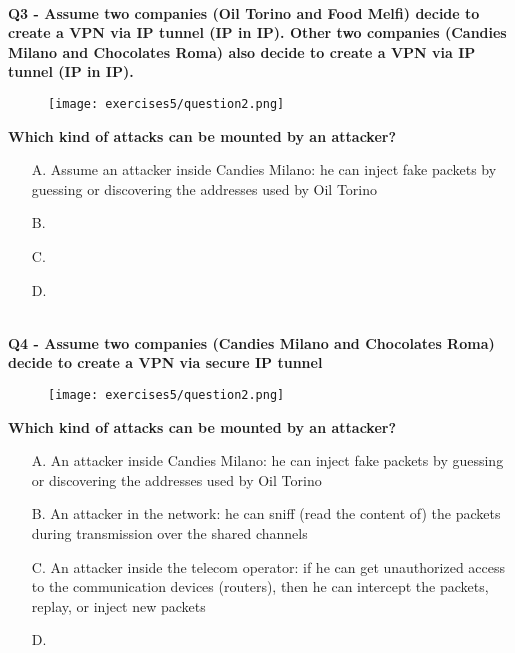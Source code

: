 \textbf{\\Q3 - Assume two companies (Oil Torino and Food Melfi) decide to create a VPN via IP tunnel (IP in IP).
Other two companies (Candies Milano and Chocolates Roma) also decide to create a VPN via IP tunnel (IP in IP).}
\begin{figure}[h]
    \centering
    \texttt{[image: exercises5/question2.png]}
\end{figure}
\textbf{Which kind of attacks can be mounted by an attacker?}
\begin{itemize}
    \item[A.] Assume an attacker inside Candies Milano: he can inject fake packets by guessing or discovering the addresses used by Oil Torino
    \item[B.] 
    \item[C.] 
    \item[D.] 
\end{itemize}


\textbf{\\Q4 - Assume two companies (Candies Milano and Chocolates Roma) decide to create a VPN via secure IP tunnel}
\begin{figure}[h]
    \centering
    \texttt{[image: exercises5/question2.png]}
\end{figure}
\textbf{Which kind of attacks can be mounted by an attacker?}
\begin{itemize}
    \item[A.] An attacker inside Candies Milano: he can inject fake packets by guessing or discovering the addresses used by Oil Torino
    \item[B.] An attacker in the network: he can sniff (read the content of) the packets during transmission over the shared channels
    \item[C.] An attacker inside the telecom operator: if he can get unauthorized access to the communication devices (routers), then he can intercept the packets, replay, or inject new packets
    \item[D.] 
\end{itemize}

